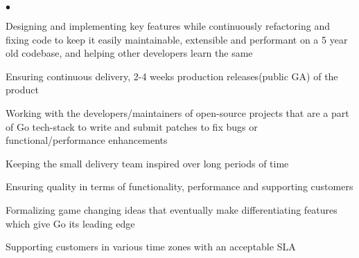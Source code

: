\documentclass[margin,line]{res}
\newenvironment{list2}{
  \begin{list}{$\bullet$}{%
      \setlength{\itemsep}{0in}
      \setlength{\parsep}{0in} \setlength{\parskip}{0in}
      \setlength{\topsep}{0in} \setlength{\partopsep}{0in} 
      \setlength{\leftmargin}{0.2in}}}{\end{list}}
\begin{document}
\begin{resume}
\vspace*{.05in}  
\begin{list2}
\item Designing and implementing key features while continuously refactoring and fixing code to keep it easily maintainable, extensible and performant on a 5 year old codebase, and helping other developers learn the same
\item Ensuring continuous delivery, 2-4 weeks production releases(public GA) of the product
\item Working with the developers/maintainers of open-source projects that are a part of Go tech-stack to write and submit patches to fix bugs or functional/performance enhancements
\item Keeping the small delivery team inspired over long periods of time
\item Ensuring quality in terms of functionality, performance and supporting customers
\item Formalizing game changing ideas that eventually make differentiating features which give Go its leading edge
\item Supporting customers in various time zones with an acceptable SLA
\end{list2}


\end{resume}
\end{document}
